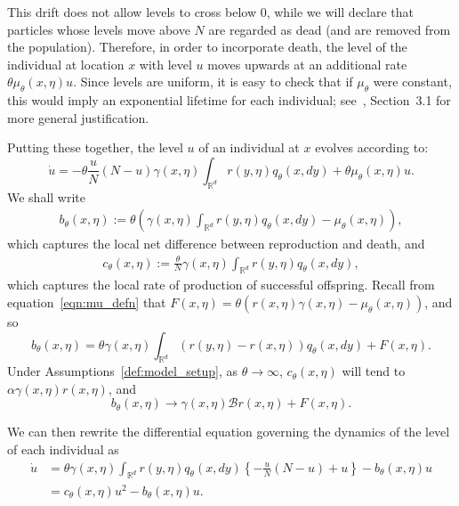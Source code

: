 \documentclass[EJP]{ejpecp} %
\newcommand{\IR}{\mathbb R}
\newcommand{\DG}{\mathcal{B}}  %
\begin{document}
This drift does not allow levels to cross below 0, 
while we will declare that particles whose levels move above $N$ are regarded as dead
(and are removed from the population).
Therefore, in order to incorporate death,
the level of the individual at location $x$ with level $u$
moves upwards at an additional rate $\theta\mu_\theta(x,\eta) u$.
Since levels are uniform,
it is easy to check that if $\mu_\theta$ were constant,
this would imply an exponential lifetime for each individual;
see~\cite{etheridge/kurtz:2019}, Section~3.1
for more general justification.

Putting these together,
the level $u$ of an individual at $x$ evolves according to:
\begin{equation} \label{eqn:dot_u}
    \dot u
    =
    - \theta\frac{u}{N} \left(N - u\right)
    \gamma(x, \eta) \int_{\IR^d} r(y, \eta) q_\theta(x, dy) 
    +
    \theta\mu_\theta(x,\eta) u .
\end{equation}
We shall write 
\begin{align*}
    b_\theta(x, \eta)
    :=
    \theta\left(
    \gamma(x,\eta) \int_{\IR^d} r(y, \eta) q_\theta(x, dy)
    -
    \mu_\theta(x,\eta)
    \right) ,
\end{align*}
which captures the local net difference between reproduction and death,
and
\begin{align} \label{c_defn}
    c_\theta(x, \eta)
    :=
    \frac{\theta}{N} \gamma(x, \eta) \int_{\IR^d} r(y, \eta) q_\theta(x, dy) ,
\end{align}
which captures the local rate of production of successful offspring.
Recall from equation~\eqref{eqn:mu_defn} that 
$F(x,\eta) = \theta(r(x,\eta)\gamma(x,\eta) - \mu_\theta(x,\eta))$,
and so 
\begin{equation}  \label{b_defn}
b_\theta(x, \eta)
=    \theta \gamma(x, \eta) \int_{\IR^d} \left( r(y, \eta) - r(x, \eta) \right) 
	q_\theta(x, dy)
    + F(x, \eta). 
\end{equation}
Under Assumptions~\ref{def:model_setup}, as $\theta \to \infty$,
$c_\theta(x, \eta)$ will tend to $\alpha \gamma(x, \eta) r(x, \eta)$, and
\begin{equation}
\label{eqn:b_limit}
    b_\theta(x, \eta) \to \gamma(x, \eta) \DG r(x, \eta) + F(x, \eta) .
\end{equation}

We can then rewrite the differential equation 
governing the dynamics of the level of each individual as
\begin{align}
\dot{u}
    &=
    \theta\gamma(x,\eta) \int_{\IR^d} r(y, \eta) q_\theta(x, dy)
    \left\{
        -\frac{u}{N}\left(N - u\right)
        + u
    \right\}
    -
	b_\theta(x,\eta) u
    \nonumber \\
    &=
    c_\theta(x, \eta) u^2
    -
	b_\theta(x, \eta) u
    . \label{differential equation for level}
\end{align}
\end{document}
